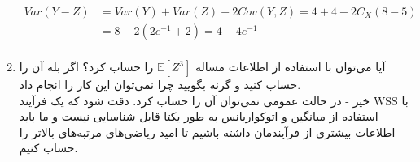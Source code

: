 \begin{enumerate}[label=(\alph*)]
\begin{align*}
		Var(Y - Z) &= Var(Y) + Var(Z) - 2Cov(Y, Z) = 4 + 4 - 2 C_X(8-5) \\
		&=8 - 2(2e^{-1} + 2) = 4 - 4e^{-1} \\
	\end{align*}
	\item 
	آیا می‌توان با استفاده از اطلاعات مساله
	$ \mathbb{E}[Z^3] $
	را حساب کرد؟ اگر بله آن را حساب کنید و گرنه بگویید چرا نمی‌توان این کار را انجام داد.
	\\
	خیر - در حالت عمومی نمی‌توان آن را حساب کرد. دقت شود که یک فرآیند WSS با استفاده از میانگین و اتوکواریانس به طور یکتا قابل شناسایی نیست و ما باید اطلاعات بیشتری از فرآیندمان داشته باشیم تا امید ریاضی‌های مرتبه‌های بالاتر را حساب کنیم.
\end{enumerate}


